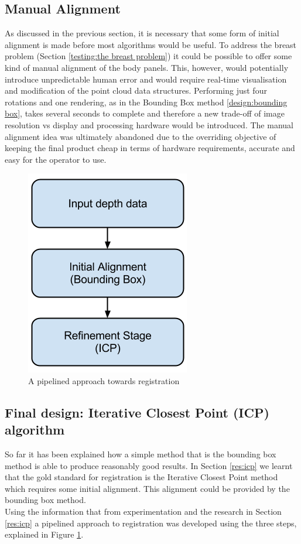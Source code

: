 \subsection{Manual Alignment}
As discussed in the previous section, it is necessary that some form of initial alignment is made before most algorithms would be useful. To address the breast problem (Section \ref{testing:the breast problem}) it could be possible to offer some kind of manual alignment of the body panels. This, however, would potentially introduce unpredictable human error and would require real-time visualisation and modification of the point cloud data structures. Performing just four rotations and one rendering, as in the Bounding Box method \ref{design:bounding box}, takes several seconds to complete and therefore a new trade-off of image resolution vs display and processing hardware would be introduced. The manual alignment idea was ultimately abandoned due to the overriding objective of keeping the final product cheap in terms of hardware requirements, accurate and easy for the operator to use. \\

\begin{figure}[h!!]
    \label{fig:registration pipeline}
    \begin{center}
        \includegraphics[scale=0.6]{zscreenshots/reg-pipeline.png}
        \caption{A pipelined approach towards registration}
    \end{center}
\end{figure}

\subsection{Final design: Iterative Closest Point (ICP) algorithm}
So far it has been explained how a simple method that is the bounding box method is able to produce reasonably good results. In Section \ref{res:icp} we learnt that the gold standard for registration is the Iterative Closest Point method which requires some initial alignment. This alignment could be provided by the bounding box method. \\ 

Using the information that from experimentation and the research in Section \ref{res:icp} a pipelined approach to registration was developed using the three steps, explained in Figure \ref{fig:registration pipeline}.

